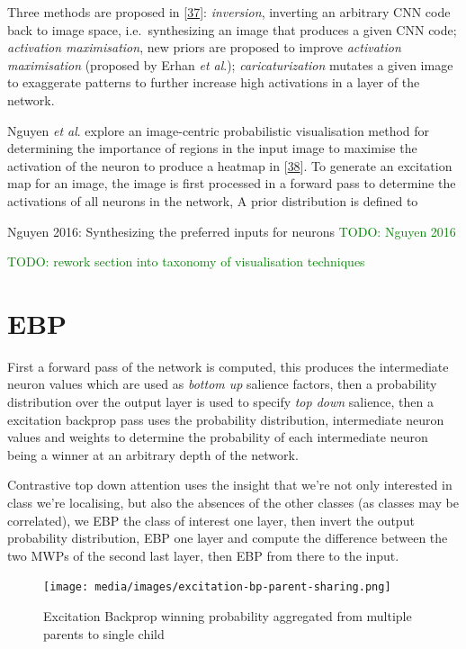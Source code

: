 \documentclass[A4paper,draft]{scrreprt}
\newcommand{\etal}{\textit{et al}.}
\begin{document}
Three methods are proposed in
{[}\protect\hyperlink{ref-mahendran2016_VisualizingDeepConvolutional}{37}{]}:
\emph{inversion}, inverting an arbitrary CNN code back to image space,
i.e.~synthesizing an image that produces a given CNN code;
\emph{activation maximisation}, new priors are proposed to improve
\emph{activation maximisation} (proposed by Erhan \etal{});
\emph{caricaturization} mutates a given image to exaggerate patterns to
further increase high activations in a layer of the network.

Nguyen \etal{} explore an image-centric probabilistic visualisation
method for determining the importance of regions in the input image to
maximise the activation of the neuron to produce a heatmap in
{[}\protect\hyperlink{ref-nguyen2016_Synthesizingpreferredinputs}{38}{]}.
To generate an excitation map for an image, the image is first processed
in a forward pass to determine the activations of all neurons in the
network, A prior distribution is defined to

Nguyen 2016: Synthesizing the preferred inputs for neurons
\textcolor{green}{TODO: Nguyen 2016}\newline

\textcolor{green}{TODO: rework section into taxonomy of visualisation techniques}\newline

\chapter{EBP}\label{ebp}

First a forward pass of the network is computed, this produces the
intermediate neuron values which are used as \emph{bottom up} salience
factors, then a probability distribution over the output layer is used
to specify \emph{top down} salience, then a excitation backprop pass
uses the probability distribution, intermediate neuron values and
weights to determine the probability of each intermediate neuron being a
winner at an arbitrary depth of the network.

Contrastive top down attention uses the insight that we're not only
interested in class we're localising, but also the absences of the other
classes (as classes may be correlated), we EBP the class of interest one
layer, then invert the output probability distribution, EBP one layer
and compute the difference between the two MWPs of the second last
layer, then EBP from there to the input.

\begin{figure}
\centering
\texttt{[image: media/images/excitation-bp-parent-sharing.png]}
\caption{Excitation Backprop winning probability aggregated from
multiple parents to single child}
\end{figure}
\end{document}
